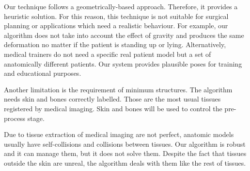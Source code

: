 Our technique follows a geometrically-based approach.  Therefore, it provides a heuristic solution. For this reason, this technique is not suitable for surgical planning or applications which need a realistic behaviour. For example, our algorithm does not take into account the effect of gravity and produces the same deformation no matter if the patient is standing up or lying. Alternatively, medical trainers do not need a specific real patient model but a set of anatomically different patients. Our system provides plausible poses for training and educational purposes.


Another limitation is the requirement of minimum structures. The algorithm needs skin and bones correctly labelled. Those are the most usual tissues registered by medical imaging. Skin and bones will be used to control the pre-process stage.
    
Due to tissue extraction of medical imaging are not perfect, anatomic models usually have self-collisions and collisions between tissues. Our algorithm is robust and it can manage them, but it does not solve them. Despite the fact that tissues outside the skin are unreal, the algorithm deals with them like the rest of tissues.
    
